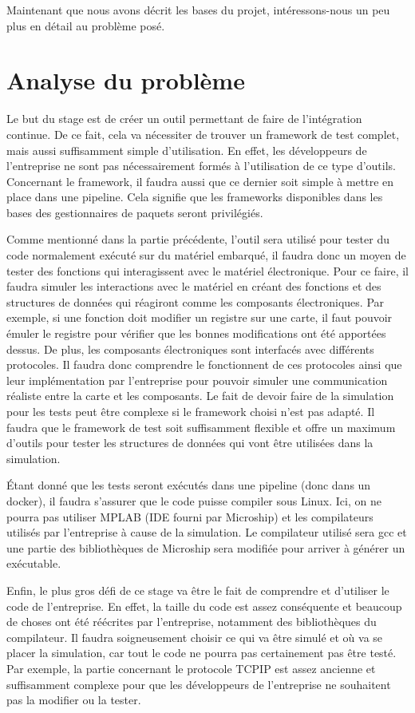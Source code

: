 \documentclass[a4paper]{article}
\begin{document}
Maintenant que nous avons décrit les bases du projet, intéressons-nous un peu
plus en détail au problème posé.
\section{Analyse du problème}%
\label{analproblem}

Le but du stage est de créer un outil permettant de faire de l'intégration
continue. De ce fait, cela va nécessiter de trouver un framework de test complet,
mais aussi suffisamment simple d'utilisation. En effet, les développeurs de
l'entreprise ne sont pas nécessairement formés à l'utilisation de ce type
d'outils. Concernant le framework, il faudra aussi que ce dernier soit simple à
mettre en place dans une pipeline. Cela signifie que les frameworks disponibles
dans les bases des gestionnaires de paquets seront privilégiés.

Comme mentionné dans la partie précédente, l'outil sera utilisé pour tester du
code normalement exécuté sur du matériel embarqué, il faudra donc un moyen de
tester des fonctions qui interagissent avec le matériel électronique. Pour ce
faire, il faudra simuler les interactions avec le matériel en créant des
fonctions et des structures de données qui réagiront comme les composants
électroniques. Par exemple, si une fonction doit modifier un registre sur une
carte, il faut pouvoir émuler le registre pour vérifier que les bonnes
modifications ont été apportées dessus. De plus, les composants électroniques
sont interfacés avec différents protocoles. Il faudra donc comprendre le
fonctionnent de ces protocoles ainsi que leur implémentation par l'entreprise
pour pouvoir simuler une communication réaliste entre la carte et les
composants. Le fait de devoir faire de la simulation pour les tests peut être
complexe si le framework choisi n'est pas adapté. Il faudra que le framework de
test soit suffisamment flexible et offre un maximum d'outils pour tester les
structures de données qui vont être utilisées dans la simulation.

Étant donné que les tests seront exécutés dans une pipeline (donc dans un
docker), il faudra s'assurer que le code puisse compiler sous Linux. Ici, on ne
pourra pas utiliser MPLAB (IDE fourni par Microship) et les compilateurs
utilisés par l'entreprise à cause de la simulation. Le compilateur utilisé sera
gcc et une partie des bibliothèques de Microship sera modifiée pour arriver à
générer un exécutable.

Enfin, le plus gros défi de ce stage va être le fait de comprendre et d'utiliser
le code de l'entreprise. En effet, la taille du code est assez conséquente et
beaucoup de choses ont été réécrites par l'entreprise, notamment des
bibliothèques du compilateur. Il faudra soigneusement choisir ce qui va être
simulé et où va se placer la simulation, car tout le code ne pourra pas
certainement pas être testé. Par exemple, la partie concernant le protocole
TCPIP est assez ancienne et suffisamment complexe pour que les développeurs de
l'entreprise ne souhaitent pas la modifier ou la tester.
\clearpage
\end{document}

